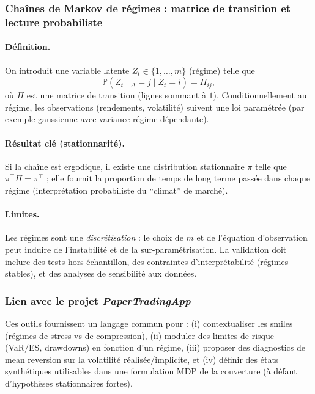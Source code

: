 \documentclass[11pt,a4paper]{article}
\newcommand{\PP}{\mathbb{P}}
\newcommand{\1}{\mathbf{1}}
\begin{document}
\subsubsection{Cha\^ines de Markov de r\'egimes : matrice de transition et lecture probabiliste}

\paragraph{D\'efinition.}
On introduit une variable latente $Z_t\in\{1,\dots,m\}$ (r\'egime) telle que
\[
\PP(Z_{t+\Delta}=j \mid Z_t=i)=\Pi_{ij},
\]
o\`u $\Pi$ est une matrice de transition (lignes sommant \`a $1$). Conditionnellement au r\'egime, les observations (rendements, volatilité)
suivent une loi param\'etr\'ee (par exemple gaussienne avec variance r\'egime-d\'ependante).

\paragraph{R\'esultat cl\'e (stationnarit\'e).}
Si la cha\^ine est ergodique, il existe une distribution stationnaire $\pi$ telle que $\pi^\top \Pi=\pi^\top$ ; elle fournit la proportion
de temps de long terme pass\'ee dans chaque r\'egime (interpr\'etation probabiliste du ``climat'' de march\'e).

\paragraph{Limites.}
Les r\'egimes sont une \emph{discr\'etisation} : le choix de $m$ et de l'\'equation d'observation peut induire de l'instabilit\'e et de la
sur-param\'etrisation. La validation doit inclure des tests hors \'echantillon, des contraintes d'interpr\'etabilit\'e (r\'egimes stables),
et des analyses de sensibilit\'e aux donn\'ees.

\subsubsection{Lien avec le projet \emph{PaperTradingApp}}

Ces outils fournissent un langage commun pour : (i) contextualiser les smiles (r\'egimes de stress vs de compression),
(ii) moduler des limites de risque (VaR/ES, drawdowns) en fonction d'un r\'egime, (iii) proposer des diagnostics de mean reversion sur la
volatilité r\'ealis\'ee/implicite, et (iv) d\'efinir des \'etats synth\'etiques utilisables dans une formulation MDP de la couverture
(\`a d\'efaut d'hypoth\`eses stationnaires fortes).
\end{document}
